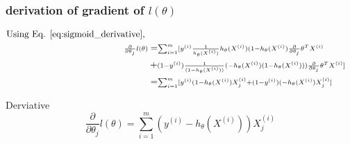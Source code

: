 \documentclass[11pt]{beamer}
\begin{document}
\begin{frame}
	\frametitle{derivation of gradient of $l(\theta)$}
	\begin{center}
	\begin{align*}
	\noindent \textrm{Using Eq. \ref{eq:sigmoid_derivative}, } \\
	\scriptstyle \frac{\partial}{\partial \theta_j} l(\theta) 
		 &= \scriptstyle \sum_{i=1}^{m} [y^{(i)} \frac{1}{h_\theta(X^{(i)})}  h_\theta(X^{(i)}) (1-h_\theta( X^{(i)}) \frac{\partial}{\partial \theta_j}\theta^T X^{(i)} \\
	\scriptstyle	&+\scriptstyle (1-y^{(i)}) \frac{1}{(1-h_\theta(X^{(i)}))}  (-h_\theta(X^{(i)}) (1-h_\theta(X^{(i)}))) \frac{\partial}{\partial \theta_j} \theta^T X^{(i)} ] \\
	\scriptstyle	&= \scriptstyle \sum_{i=1}^{m} [y^{(i)}  (1-h_\theta( X^{(i)}) X^{(i)}_j + (1-y^{(i)})  (-h_\theta(X^{(i)})  X^{(i)}_j ]	
	\end{align*} \vspace{-20pt}
	\begin{block}{Derviative}
	\begin{equation*}
		\frac{\partial}{\partial \theta_j} l(\theta) = \sum_{i=1}^{m} (y^{(i)} -h_\theta(X^{(i)}))  X^{(i)}_j 
	\end{equation*}
	\end{block}
	\end{center}
\end{frame}
\end{document}
